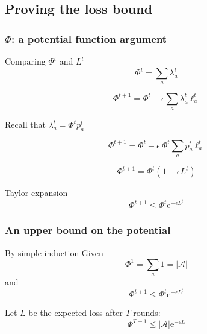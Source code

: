 \documentclass{beamer}
\begin{document}
\subsection{Proving the loss bound}
\begin{frame}
    \frametitle{$\Phi$: a potential function argument}

    \begin{block}{Comparing $\Phi^t$ and $L^t$}
    \begin{equation*}
    \Phi^t = \sum_a \lambda_a^t
    \end{equation*}

    \begin{equation*}
    \Phi^{t+1}  = \Phi^t - \epsilon \sum_a \lambda_a^t \ell_a^t
    \end{equation*}

    Recall that $\lambda_a^t = \Phi^t p_a^t$

    \begin{equation*}
    \Phi^{t+1} = \Phi^t - \epsilon~\Phi^t \sum_a p_a^t \ell_a^t
    \end{equation*}

    \begin{equation*}
    \Phi^{t+1} = \Phi^t (1 - \epsilon L^t)
    \end{equation*}
    \end{block}

    \begin{block}{Taylor expansion}
    \begin{equation*}
        \Phi^{t+1} \leq \Phi^t \mathrm{e}^{- \epsilon L^t}
    \end{equation*}
    \end{block}

\end{frame}

\begin{frame}
    \frametitle{An upper bound on the potential}

    \begin{block}{By simple induction}
    Given
    \begin{equation*}
        \Phi^1 = \sum_a 1 = |\mathcal{A}|
    \end{equation*}
    and
    \begin{equation*}
        \Phi^{t+1} \leq \Phi^t \mathrm{e}^{- \epsilon L^t}
    \end{equation*}

    Let $L$ be the expected loss after $T$ rounds:
    \alert{\begin{equation*}
            \Phi^{T+1} \leq |\mathcal{A}| \mathrm{e}^{- \epsilon L}
    \end{equation*}}
    \end{block}

\end{frame}
\end{document}
